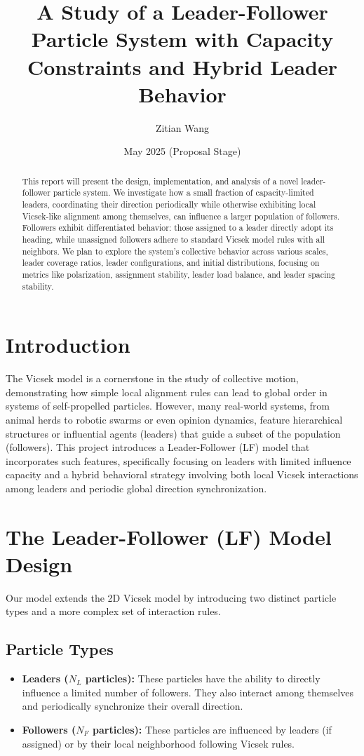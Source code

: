 \documentclass[11pt]{article}
\title{A Study of a Leader-Follower Particle System with Capacity Constraints and Hybrid Leader Behavior}
\author{Zitian Wang}
\date{May 2025 (Proposal Stage)}
\begin{document}
\maketitle

\begin{abstract}
This report will present the design, implementation, and analysis of a novel leader-follower particle system. 
We investigate how a small fraction of capacity-limited leaders, coordinating their direction periodically 
while otherwise exhibiting local Vicsek-like alignment among themselves, can influence a larger population of followers. 
Followers exhibit differentiated behavior: those assigned to a leader directly adopt its heading, while unassigned 
followers adhere to standard Vicsek model rules with all neighbors. We plan to explore the system's collective 
behavior across various scales, leader coverage ratios, leader configurations, and initial distributions, 
focusing on metrics like polarization, assignment stability, leader load balance, and leader spacing stability.
\end{abstract}

\section{Introduction}
The Vicsek model is a cornerstone in the study of collective motion, demonstrating how simple local alignment rules 
can lead to global order in systems of self-propelled particles. However, many real-world systems, from animal herds 
to robotic swarms or even opinion dynamics, feature hierarchical structures or influential agents (leaders) 
that guide a subset of the population (followers). This project introduces a Leader-Follower (LF) model 
that incorporates such features, specifically focusing on leaders with limited influence capacity and a hybrid 
behavioral strategy involving both local Vicsek interactions among leaders and periodic global direction synchronization.

\section{The Leader-Follower (LF) Model Design}
Our model extends the 2D Vicsek model by introducing two distinct particle types and a more complex set of interaction rules.

\subsection{Particle Types}
\begin{itemize}
    \item \textbf{Leaders ($N_L$ particles):} These particles have the ability to directly influence a limited number of followers. They also interact among themselves and periodically synchronize their overall direction.
    \item \textbf{Followers ($N_F$ particles):} These particles are influenced by leaders (if assigned) or by their local neighborhood following Vicsek rules.
\end{itemize}
\end{document}
